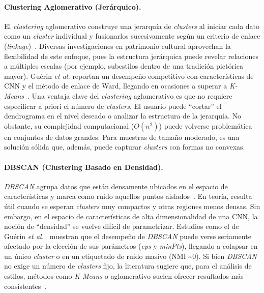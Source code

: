 \paragraph{Clustering Aglomerativo (Jerárquico).}
El \textit{clustering} aglomerativo construye una jerarquía de \textit{clusters} al iniciar cada dato como un \textit{cluster} individual y fusionarlos sucesivamente según un criterio de enlace (\textit{linkage})~\cite{guerin2018,parisotto2022}.
Diversas investigaciones en patrimonio cultural aprovechan la flexibilidad de este enfoque, pues la estructura jerárquica puede revelar relaciones a múltiples escalas (por ejemplo, subestilos dentro de una tradición pictórica mayor).
Guérin \textit{et al.} reportan un desempeño competitivo con características de CNN y el método de enlace de Ward, llegando en ocasiones a superar a \textit{K-Means}~\cite{guerin2018}.
Una ventaja clave del \textit{clustering} aglomerativo es que no requiere especificar a priori el número de \textit{clusters}.
El usuario puede “cortar” el dendrograma en el nivel deseado o analizar la estructura de la jerarquía. No obstante, su complejidad computacional ($O(n^2)$) puede volverse problemática en conjuntos de datos grandes.
Para muestras de tamaño moderado, es una solución sólida que, además, puede capturar \textit{clusters} con formas no convexas.

\paragraph{DBSCAN (Clustering Basado en Densidad).}
\textit{DBSCAN} agrupa datos que están densamente ubicados en el espacio de características y marca como ruido aquellos puntos aislados~\cite{guerin2018}.
En teoría, resulta útil cuando se esperan \textit{clusters} muy compactos y otras regiones menos densas.
Sin embargo, en el espacio de características de alta dimensionalidad de una CNN, la noción de “densidad” se vuelve difícil de parametrizar.
Estudios como el de Guérin \textit{et al.}~\cite{guerin2018} muestran que el desempeño de \textit{DBSCAN} puede verse seriamente afectado por la elección de sus parámetros (\textit{eps} y \textit{minPts}), llegando a colapsar en un único \textit{cluster} o en un etiquetado de ruido masivo (NMI \textasciitilde 0).
Si bien \textit{DBSCAN} no exige un número de \textit{clusters} fijo, la literatura sugiere que, para el análisis de estilos, métodos como \textit{K-Means} o aglomerativo suelen ofrecer resultados más consistentes~\cite{dangeti2024}.

